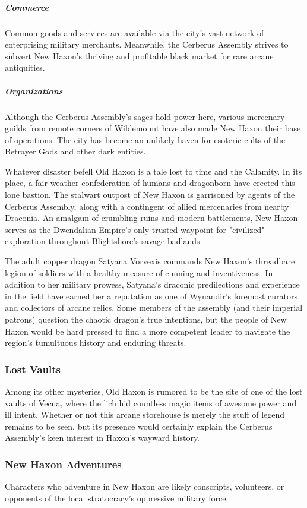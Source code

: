 \documentclass[10pt,a4paper,twoside,bg=print,twocolumn,openany,nodeprecatedcode]{dndbook}
\begin{document}
\subparagraph{Commerce}
Common goods and services are available via the city's vast network of enterprising military merchants. Meanwhile, the Cerberus Assembly strives to subvert New Haxon's thriving and profitable black market for rare arcane antiquities.

\subparagraph{Organizations}
Although the Cerberus Assembly's sages hold power here, various mercenary guilds from remote corners of Wildemount have also made New Haxon their base of operations. The city has become an unlikely haven for esoteric cults of the Betrayer Gods and other dark entities.

Whatever disaster befell Old Haxon is a tale lost to time and the Calamity. In its place, a fair-weather confederation of humans and dragonborn have erected this lone bastion. The stalwart outpost of New Haxon is garrisoned by agents of the Cerberus Assembly, along with a contingent of allied mercenaries from nearby Draconia. An amalgam of crumbling ruins and modern battlements, New Haxon serves as the Dwendalian Empire's only trusted waypoint for "civilized" exploration throughout Blightshore's savage badlands.

The adult copper dragon Satyana Vorvexis commands New Haxon's threadbare legion of soldiers with a healthy measure of cunning and inventiveness. In addition to her military prowess, Satyana's draconic predilections and experience in the field have earned her a reputation as one of Wynandir's foremost curators and collectors of arcane relics. Some members of the assembly (and their imperial patrons) question the chaotic dragon's true intentions, but the people of New Haxon would be hard pressed to find a more competent leader to navigate the region's tumultuous history and enduring threats.

\subsubsection{Lost Vaults}
Among its other mysteries, Old Haxon is rumored to be the site of one of the lost vaults of Vecna, where the lich hid countless magic items of awesome power and ill intent. Whether or not this arcane storehouse is merely the stuff of legend remains to be seen, but its presence would certainly explain the Cerberus Assembly's keen interest in Haxon's wayward history.

\subsubsection{New Haxon Adventures}
Characters who adventure in New Haxon are likely conscripts, volunteers, or opponents of the local stratocracy's oppressive military force.
\end{document}
